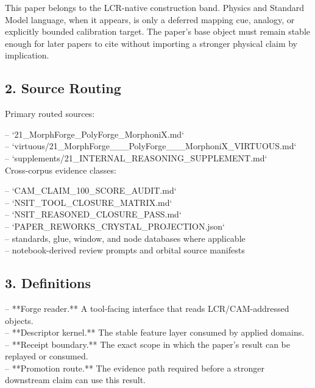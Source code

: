 \documentclass[11pt]{article}
\begin{document}
This paper belongs to the LCR-native construction band. Physics and Standard Model language, when it appears, is only a deferred mapping cue, analogy, or explicitly bounded calibration target. The paper's base object must remain stable enough for later papers to cite without importing a stronger physical claim by implication.

\subsection*{2. Source Routing}

Primary routed sources:

\noindent{}-- `21\_MorphForge\_PolyForge\_MorphoniX.md`\\
\noindent{}-- `virtuous/21\_MorphForge\_\_\_PolyForge\_\_\_MorphoniX\_VIRTUOUS.md`\\
\noindent{}-- `supplements/21\_INTERNAL\_REASONING\_SUPPLEMENT.md`\\

Cross-corpus evidence classes:

\noindent{}-- `CAM\_CLAIM\_100\_SCORE\_AUDIT.md`\\
\noindent{}-- `NSIT\_TOOL\_CLOSURE\_MATRIX.md`\\
\noindent{}-- `NSIT\_REASONED\_CLOSURE\_PASS.md`\\
\noindent{}-- `PAPER\_REWORKS\_CRYSTAL\_PROJECTION.json`\\
\noindent{}-- standards, glue, window, and node databases where applicable\\
\noindent{}-- notebook-derived review prompts and orbital source manifests\\

\subsection*{3. Definitions}

\noindent{}-- **Forge reader.** A tool-facing interface that reads LCR/CAM-addressed objects.\\
\noindent{}-- **Descriptor kernel.** The stable feature layer consumed by applied domains.\\
\noindent{}-- **Receipt boundary.** The exact scope in which the paper's result can be replayed or consumed.\\
\noindent{}-- **Promotion route.** The evidence path required before a stronger downstream claim can use this result.\\
\end{document}
